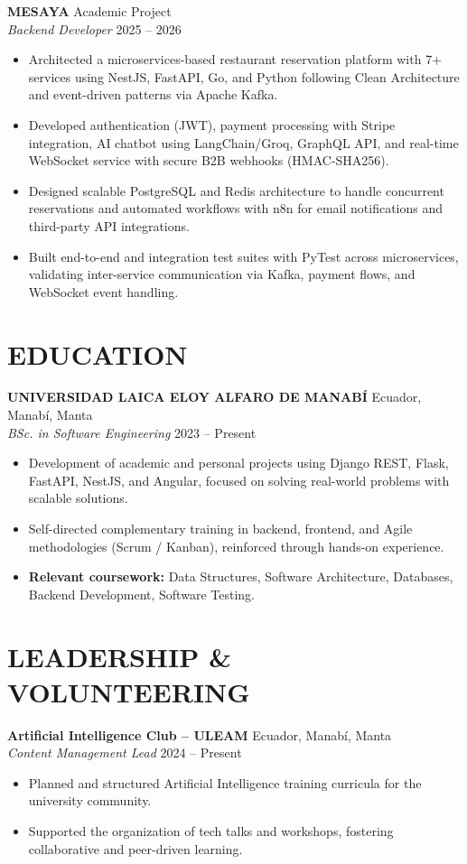 \documentclass[11pt, a4paper]{article}
\begin{document}
\textbf{MESAYA} \hfill Academic Project \\
\textit{Backend Developer} \hfill 2025 -- 2026

\begin{itemize}
\item Architected a microservices-based restaurant reservation platform with 7+ services using NestJS, FastAPI, Go, and Python following Clean Architecture and event-driven patterns via Apache Kafka.
\item Developed authentication (JWT), payment processing with Stripe integration, AI chatbot using LangChain/Groq, GraphQL API, and real-time WebSocket service with secure B2B webhooks (HMAC-SHA256).
\item Designed scalable PostgreSQL and Redis architecture to handle concurrent reservations and automated workflows with n8n for email notifications and third-party API integrations.
\item Built end-to-end and integration test suites with PyTest across microservices, validating inter-service communication via Kafka, payment flows, and WebSocket event handling.
\end{itemize}

\section*{EDUCATION}

\textbf{UNIVERSIDAD LAICA ELOY ALFARO DE MANABÍ} \hfill Ecuador, Manabí, Manta \\
\textit{BSc. in Software Engineering} \hfill 2023 -- Present

\begin{itemize}
\item Development of academic and personal projects using Django REST, Flask, FastAPI, NestJS, and Angular, focused on solving real-world problems with scalable solutions.
\item Self-directed complementary training in backend, frontend, and Agile methodologies (Scrum / Kanban), reinforced through hands-on experience.
\item \textbf{Relevant coursework:} Data Structures, Software Architecture, Databases, Backend Development, Software Testing.
\end{itemize}

\section*{LEADERSHIP \& VOLUNTEERING}

\textbf{Artificial Intelligence Club -- ULEAM} \hfill Ecuador, Manabí, Manta \\
\textit{Content Management Lead} \hfill 2024 -- Present

\begin{itemize}
\item Planned and structured Artificial Intelligence training curricula for the university community.
\item Supported the organization of tech talks and workshops, fostering collaborative and peer-driven learning.
\end{itemize}
\end{document}
